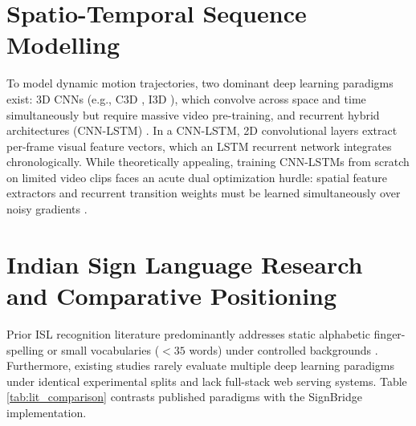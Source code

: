 \section{Spatio-Temporal Sequence Modelling}
\label{sec:lit_temporal}
To model dynamic motion trajectories, two dominant deep learning paradigms exist: 3D CNNs (e.g., C3D \cite{tran2015learning}, I3D \cite{carreira2017quo}), which convolve across space and time simultaneously but require massive video pre-training, and recurrent hybrid architectures (CNN-LSTM) \cite{donahue2015long}. In a CNN-LSTM, 2D convolutional layers extract per-frame visual feature vectors, which an LSTM recurrent network \cite{hochreiter1997long} integrates chronologically. While theoretically appealing, training CNN-LSTMs from scratch on limited video clips faces an acute dual optimization hurdle: spatial feature extractors and recurrent transition weights must be learned simultaneously over noisy gradients \cite{adaloglou2022comprehensive}.

\section{Indian Sign Language Research and Comparative Positioning}
\label{sec:lit_isl}
Prior ISL recognition literature predominantly addresses static alphabetic finger-spelling or small vocabularies ($<35$ words) under controlled backgrounds \cite{raheja2016real, kumar2018indian}. Furthermore, existing studies rarely evaluate multiple deep learning paradigms under identical experimental splits and lack full-stack web serving systems. Table \ref{tab:lit_comparison} contrasts published paradigms with the SignBridge implementation.

